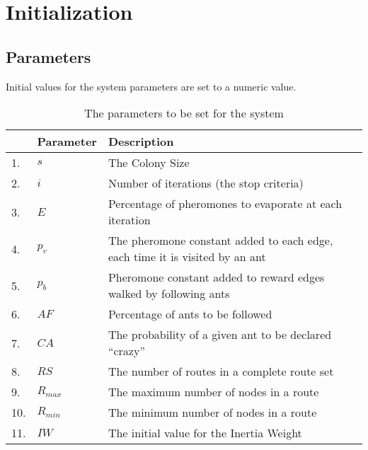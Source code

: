 \section{Initialization}
\label{sec:algoInitialization}
\subsection{Parameters}
Initial values for the system parameters are set to a numeric value. 

\begin{table}[H]
    \centering
	\begin{tabular}{|l|l|m{9cm}|}
    	\hline
    	~ & \textbf{Parameter} & \textbf{Description} \\
    	\hline
    	1. & $s$ & The Colony Size \\
        
    	2. & $i$ & Number of iterations (the stop criteria) \\

    	3. & $E$ & Percentage of pheromones to evaporate at each iteration \\

    	4. & $p_v$ & The pheromone constant added to each edge, each time it is visited by an ant \\
        
        5. & $p_b$ & Pheromone constant added to reward edges walked by following ants \\
   		
   		6. & $AF$ & Percentage of ants to be followed \\

   		7. & $CA$ & The probability of a given ant to be declared ``crazy'' \\
        
    	8. & $RS$ & The number of routes in a complete route set \\
        
    	9. & $R_{max}$ & The maximum number of nodes in a route \\

        10. & $R_{min}$ & The minimum number of nodes in a route \\

        11. & $IW$ & The initial value for the Inertia Weight \\
   	    \hline
    \end{tabular}
    \caption {The parameters to be set for the system}
    \label{table:parametersToBeSet}
\end{table}


